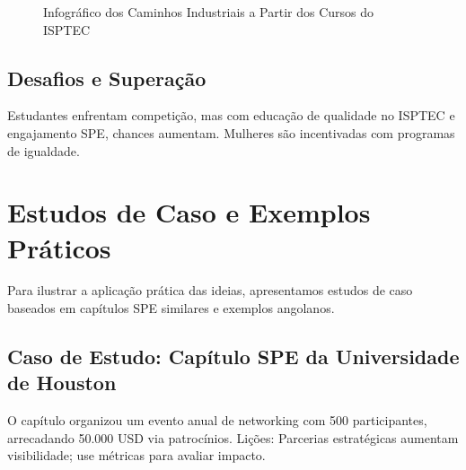 \documentclass[12pt]{article}
\begin{document}
\begin{figure}[h]
{
}
\caption{Infográfico dos Caminhos Industriais a Partir dos Cursos do ISPTEC}
\end{figure}

\subsection{Desafios e Superação}
Estudantes enfrentam competição, mas com educação de qualidade no ISPTEC e engajamento SPE, chances aumentam. Mulheres são incentivadas com programas de igualdade.

\newpage

\section{Estudos de Caso e Exemplos Práticos}

Para ilustrar a aplicação prática das ideias, apresentamos estudos de caso baseados em capítulos SPE similares e exemplos angolanos.

\subsection{Caso de Estudo: Capítulo SPE da Universidade de Houston}
O capítulo organizou um evento anual de networking com 500 participantes, arrecadando 50.000 USD via patrocínios. Lições: Parcerias estratégicas aumentam visibilidade; use métricas para avaliar impacto.
\end{document}

